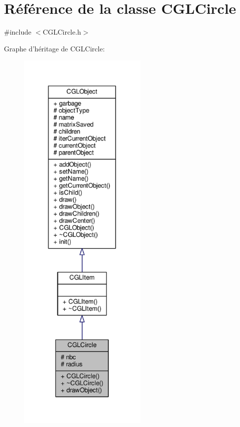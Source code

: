 \hypertarget{class_c_g_l_circle}{\section{Référence de la classe C\-G\-L\-Circle}
\label{class_c_g_l_circle}
}


{\ttfamily \#include $<$C\-G\-L\-Circle.\-h$>$}



Graphe d'héritage de C\-G\-L\-Circle\-:\nopagebreak
\begin{figure}[H]
\begin{center}
\leavevmode
\includegraphics[height=550pt]{df/d3e/class_c_g_l_circle__inherit__graph}
\end{center}
\end{figure}


